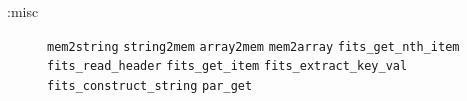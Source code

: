 \documentclass[twoside,11pt]{article}
\begin{document}
\begin{description}
\item[:misc]%
\mbox{}
\begin{flushleft}
\texttt{mem2string} \texttt{string2mem} \texttt{array2mem}
\texttt{mem2array} \texttt{fits\_get\_nth\_item} \texttt{fits\_read\_header}
\texttt{fits\_get\_item} \texttt{fits\_extract\_key\_val}
\texttt{fits\_construct\_string} \texttt{par\_get}
\end{flushleft}

\end{description}

\end{document}
